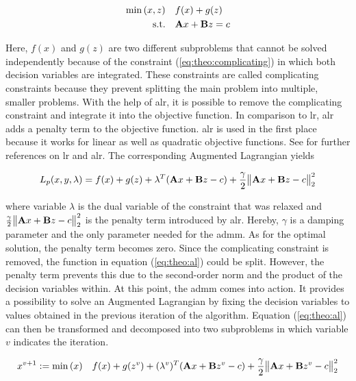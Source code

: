 \begin{subequations}
	\begin{align}
		\min{(x, z)} \quad & f(x) + g(z) \\
		\text{s.t.} \quad & \vb{A}x + \vb{B}z = c \label{eq:theo:complicating}
	\end{align}
\end{subequations}

Here, $f(x)$ and $g(z)$ are two different subproblems that cannot be solved independently because of the constraint (\ref{eq:theo:complicating}) in which both decision variables are integrated. These constraints are called complicating constraints because they prevent splitting the main problem into multiple, smaller problems. With the help of \gls{alr}, it is possible to remove the complicating constraint and integrate it into the objective function. In comparison to \gls{lr}, \gls{alr} adds a penalty term to the objective function. \gls{alr} is used in the first place because it works for linear as well as quadratic objective functions. See \citet{conejo2006} for further references on \gls{lr} and \gls{alr}. The corresponding Augmented Lagrangian yields

\begin{equation}
	L_p(x,y, \lambda) = f(x) + g(z) + \lambda^T(\vb{A}x + \vb{B}z - c) + \frac{\gamma}{2}\big\| \vb{A}x + \vb{B}z - c \big\|^2_2 \label{eq:theo:al}
\end{equation}

where variable $\lambda$ is the dual variable of the constraint that was relaxed and $\frac{\gamma}{2}\big\| \vb{A}x + \vb{B}z - c \big\|^2_2$ is the penalty term introduced by \gls{alr}. Hereby, $\gamma$ is a damping parameter and the only parameter needed for the \gls{admm}. As for the optimal solution, the penalty term becomes zero. Since the complicating constraint is removed, the function in equation (\ref{eq:theo:al}) could be split. However, the penalty term prevents this due to the second-order norm and the product of the decision variables within. At this point, the \gls{admm} comes into action. It provides a possibility to solve an Augmented Lagrangian by fixing the decision variables to values obtained in the previous iteration of the algorithm. Equation (\ref{eq:theo:al}) can then be transformed and decomposed into two subproblems in which variable $v$ indicates the iteration.

\begin{equation}
	x^{v+1} := \min{(x)} \quad f(x) + g(z^{v}) + (\lambda^v)^T(\vb{A}x + \vb{B}z^v - c) + \frac{\gamma}{2}\big\| \vb{A}x + \vb{B}z^v - c \big\|^2_2 \label{eq:theo:x-update}
\end{equation}

